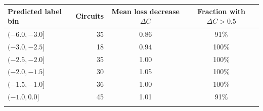 \begin{tabular}{lrcc}
\toprule
Predicted label bin & Circuits & Mean loss decrease $\Delta C$ & Fraction with $\Delta C>0.5$ \\
\midrule
$(-6.0, -3.0]$ & 35 & 0.86 & 91\% \\
$(-3.0, -2.5]$ & 18 & 0.94 & 100\% \\
$(-2.5, -2.0]$ & 35 & 1.00 & 100\% \\
$(-2.0, -1.5]$ & 30 & 1.05 & 100\% \\
$(-1.5, -1.0]$ & 36 & 1.00 & 100\% \\
$(-1.0, 0.0]$ & 45 & 1.01 & 91\% \\
\botrule
\end{tabular}
